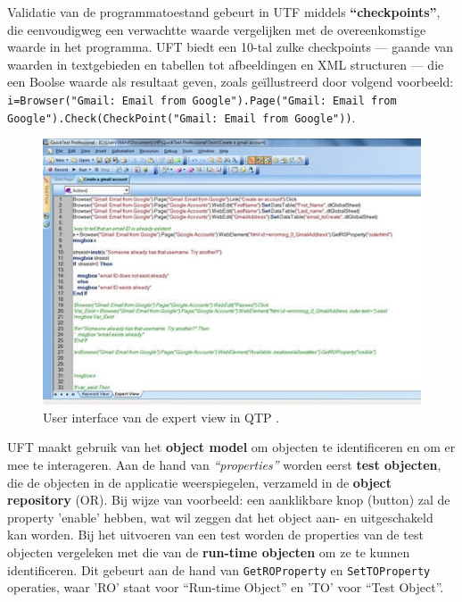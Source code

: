 Validatie van de programmatoestand gebeurt in UTF middels \textbf{``checkpoints''}, die eenvoudigweg een verwachtte waarde vergelijken met de overeenkomstige waarde in het programma. UFT biedt een 10-tal zulke checkpoints — gaande van waarden in textgebieden en tabellen tot afbeeldingen en XML structuren — die een Boolse waarde als resultaat geven, zoals geïllustreerd door volgend voorbeeld: \texttt{i=Browser("Gmail: Email from Google").Page("Gmail: Email from Google").Check(CheckPoint("Gmail: Email from Google"))}. \autocite{SoftwareTestingHelpStepGenerator}

\begin{figure}[h!]
    \centering
    \includegraphics[scale=0.8]{img/SoftwareTestingHelpQTPExpertView.jpg}
    \caption{User interface van de expert view in QTP \autocite{SoftwareTestingHelpStepGenerator}.}
    \label{fig:utfexpertview}
\end{figure}

UFT maakt gebruik van het \textbf{object model} om objecten te identificeren en om er mee te interageren. Aan de hand van \emph{``properties''} worden eerst \textbf{test objecten}, die de objecten in de applicatie weerspiegelen, verzameld in de \textbf{object repository} (OR). Bij wijze van voorbeeld: een aanklikbare knop (button) zal de property 'enable' hebben, wat wil zeggen dat het object aan- en uitgeschakeld kan worden. Bij het uitvoeren van een test worden de properties van de test objecten  vergeleken met die van de \textbf{run-time objecten} om ze te kunnen identificeren. Dit gebeurt aan de hand van \texttt{GetROProperty} en \texttt{SetTOProperty} operaties, waar 'RO' staat voor ``Run-time Object'' en 'TO' voor ``Test Object''. \autocite{TutorialspointQTPQuickGuide,LearnQTP2017ObjectRepo,LearnQTP2017ObjectRepo}

